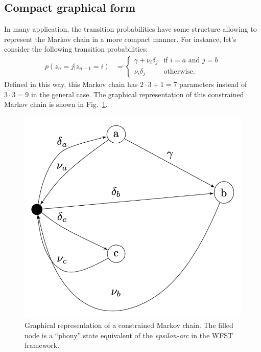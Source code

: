 \subsection{Compact graphical form}
In many application, the transition probabilities have some structure
allowing to represent the Markov chain in a more compact manner. For
instance, let's consider the following transition probabilities:
\begin{align}
    p(z_n = j | z_{n-1} = i) &= \begin{cases}
        \gamma + \nu_i \delta_j & \text{if } i = a \text{ and } j=b \\
        \nu_i\delta_j & \text{otherwise}.
    \end{cases}
\end{align}
Defined in this way, this Markov chain has $2 \cdot 3 + 1 = 7$
parameters instead of $3 \cdot 3 = 9$ in the general case. The graphical
representation of this constrained Markov chain is shown in
Fig.~\ref{markovchains:fig:consgraph}.
%
\begin{figure}[t]
    \centering
    \includegraphics[scale=0.5]{images/consgraph_resized.png}
    \caption{Graphical representation of a constrained Markov chain.
    The filled node is a ``phony'' state equivalent of the
    \emph{epsilon-arc} in the WFST framework.}
    \label{markovchains:fig:consgraph}
\end{figure}

